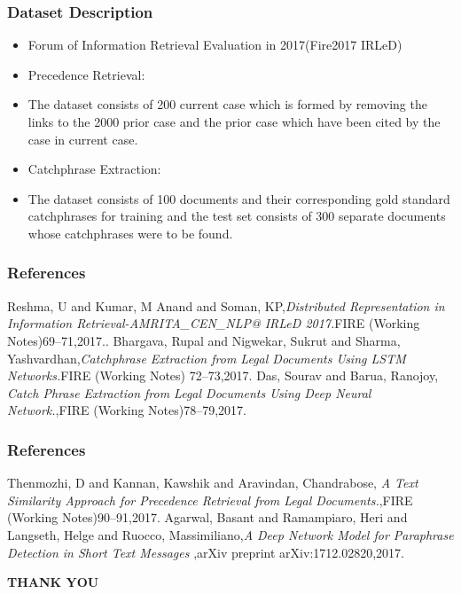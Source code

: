\documentclass{beamer}
\begin{document}
\begin{frame}\frametitle{Dataset Description}
	\begin{itemize}
		\item  Forum of Information Retrieval Evaluation
in 2017(Fire2017  IRLeD)
	\end{itemize}
\begin{itemize}
 \item Precedence Retrieval:
\end{itemize}
		\begin{itemize}
			 \item The dataset consists of 200 current case which is formed by removing the links to the 2000 prior case and the prior case which have been cited by the case in current case.
		\end{itemize}
\begin{itemize}
 \item Catchphrase Extraction:
\end{itemize}
	\begin{itemize}
\item The dataset consists of 100 documents and their corresponding gold standard catchphrases for training and the test set consists of 300 separate documents whose catchphrases were to be found.
	\end{itemize}
\end{frame}



\begin{frame}\frametitle{References}
\begin{thebibliography}{99}
    
	Reshma, U and Kumar, M Anand and Soman, KP,{\em Distributed Representation in Information Retrieval-AMRITA\_CEN\_NLP@ IRLeD 2017.}FIRE (Working Notes)69--71,2017..
	Bhargava, Rupal and Nigwekar, Sukrut and Sharma, Yashvardhan,{\em Catchphrase Extraction from Legal Documents Using LSTM Networks.}FIRE (Working Notes) 72--73,2017.
	Das, Sourav and Barua, Ranojoy, {\em Catch Phrase Extraction from Legal Documents Using Deep Neural Network.},FIRE (Working Notes)78--79,2017.
\end{thebibliography}
\end{frame}
	
\begin{frame}\frametitle{References}
	\begin{thebibliography}{99}	
	 Thenmozhi, D and Kannan, Kawshik and Aravindan, Chandrabose, {\em A Text Similarity Approach for Precedence Retrieval from Legal Documents.},FIRE (Working Notes)90--91,2017.
	Agarwal, Basant and Ramampiaro, Heri and Langseth, Helge and Ruocco, Massimiliano,{\em A Deep Network Model for Paraphrase Detection in Short Text Messages} ,arXiv preprint arXiv:1712.02820,2017.
\end{thebibliography}
\end{frame}

\begin{frame}
    \begin{LARGE}
    \begin{Huge}
    \begin{center}
        \textbf{THANK YOU}
    \end{center}  
    \end{Huge}  
    \end{LARGE}
  
  
\end{frame}
\end{document}
